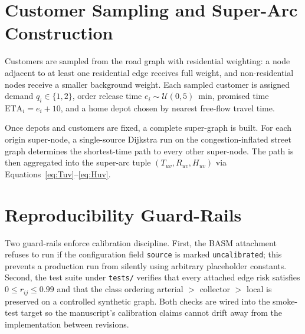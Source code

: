 \section{Customer Sampling and Super-Arc Construction}

Customers are sampled from the road graph with residential weighting:
a node adjacent to at least one residential edge receives full
weight, and non-residential nodes receive a smaller background
weight. Each sampled customer is assigned demand $q_i \in \{1, 2\}$,
order release time $e_i \sim \mathcal{U}(0, 5)$~min, promised time
$\mathrm{ETA}_i = e_i + 10$, and a home depot chosen by nearest
free-flow travel time.

Once depots and customers are fixed, a complete super-graph is
built. For each origin super-node, a single-source Dijkstra run on
the congestion-inflated street graph determines the shortest-time
path to every other super-node. The path is then aggregated into the
super-arc tuple $(T_{uv}, R_{uv}, H_{uv})$ via
Equations~\eqref{eq:Tuv}--\eqref{eq:Huv}.

\section{Reproducibility Guard-Rails}

Two guard-rails enforce calibration discipline. First, the BASM
attachment refuses to run if the configuration field
\texttt{source} is marked \texttt{uncalibrated}; this prevents a
production run from silently using arbitrary placeholder constants.
Second, the test suite under \texttt{tests/} verifies that every
attached edge risk satisfies $0 \leq r_{ij} \leq 0.99$ and that the
class ordering arterial $>$ collector $>$ local is preserved on a
controlled synthetic graph. Both checks are wired into the smoke-test
target so the manuscript's calibration claims cannot drift away from
the implementation between revisions.
